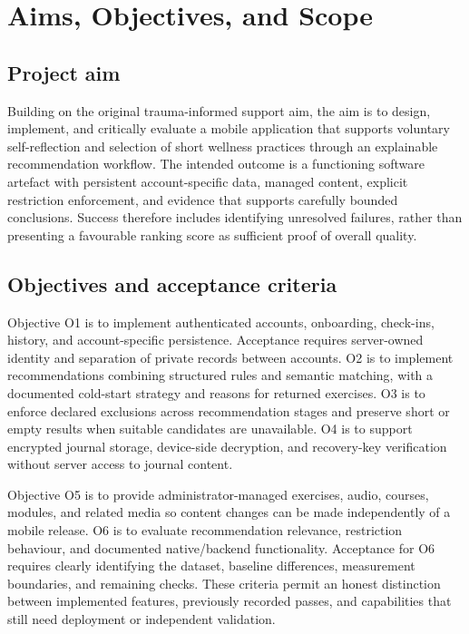 \section{Aims, Objectives, and Scope}\label{sec:chapter-3}

\subsection{Project aim}

Building on the original trauma-informed support aim, the aim is to design, implement, and critically evaluate a mobile application that supports voluntary self-reflection and selection of short wellness practices through an explainable recommendation workflow. The intended outcome is a functioning software artefact with persistent account-specific data, managed content, explicit restriction enforcement, and evidence that supports carefully bounded conclusions. Success therefore includes identifying unresolved failures, rather than presenting a favourable ranking score as sufficient proof of overall quality.

\subsection{Objectives and acceptance criteria}

Objective O1 is to implement authenticated accounts, onboarding, check-ins, history, and account-specific persistence. Acceptance requires server-owned identity and separation of private records between accounts. O2 is to implement recommendations combining structured rules and semantic matching, with a documented cold-start strategy and reasons for returned exercises. O3 is to enforce declared exclusions across recommendation stages and preserve short or empty results when suitable candidates are unavailable. O4 is to support encrypted journal storage, device-side decryption, and recovery-key verification without server access to journal content.

Objective O5 is to provide administrator-managed exercises, audio, courses, modules, and related media so content changes can be made independently of a mobile release. O6 is to evaluate recommendation relevance, restriction behaviour, and documented native/\allowbreak{}backend functionality. Acceptance for O6 requires clearly identifying the dataset, baseline differences, measurement boundaries, and remaining checks. These criteria permit an honest distinction between implemented features, previously recorded passes, and capabilities that still need deployment or independent validation.

